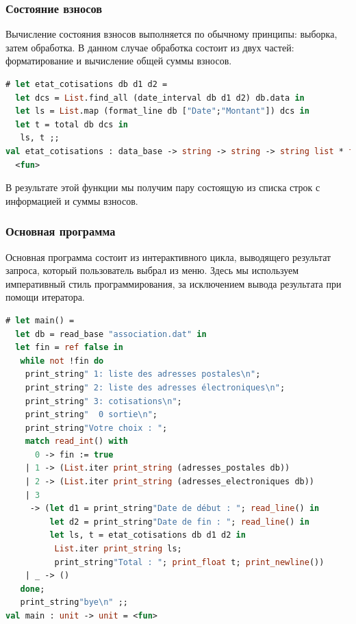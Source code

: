 \subsubsection{Состояние взносов}

Вычисление состояния взносов выполняется по обычному принципы: выборка, затем 
обработка. В данном случае обработка состоит из двух частей: форматирование и 
вычисление общей суммы взносов.

\begin{lstlisting}[language=OCaml]
# let etat_cotisations db d1 d2 =
  let dcs = List.find_all (date_interval db d1 d2) db.data in
  let ls = List.map (format_line db ["Date";"Montant"]) dcs in
  let t = total db dcs in
   ls, t ;;
val etat_cotisations : data_base -> string -> string -> string list * float =
  <fun>
\end{lstlisting}

В результате этой функции мы получим пару состоящую из списка строк с 
информацией и суммы взносов.

\subsubsection{Основная программа}

Основная программа состоит из интерактивного цикла, выводящего результат 
запроса, который пользователь выбрал из меню. Здесь мы используем императивный 
стиль программирования, за исключением вывода результата при помощи итератора.

\begin{lstlisting}[language=OCaml]
# let main() =
  let db = read_base "association.dat" in
  let fin = ref false in
   while not !fin do
    print_string" 1: liste des adresses postales\n";
    print_string" 2: liste des adresses électroniques\n";
    print_string" 3: cotisations\n";
    print_string"  0 sortie\n";
    print_string"Votre choix : ";
    match read_int() with
      0 -> fin := true
    | 1 -> (List.iter print_string (adresses_postales db))
    | 2 -> (List.iter print_string (adresses_electroniques db))
    | 3
     -> (let d1 = print_string"Date de début : "; read_line() in
         let d2 = print_string"Date de fin : "; read_line() in
         let ls, t = etat_cotisations db d1 d2 in
          List.iter print_string ls;
          print_string"Total : "; print_float t; print_newline())
    | _ -> ()
   done;
   print_string"bye\n" ;;
val main : unit -> unit = <fun>
\end{lstlisting}

